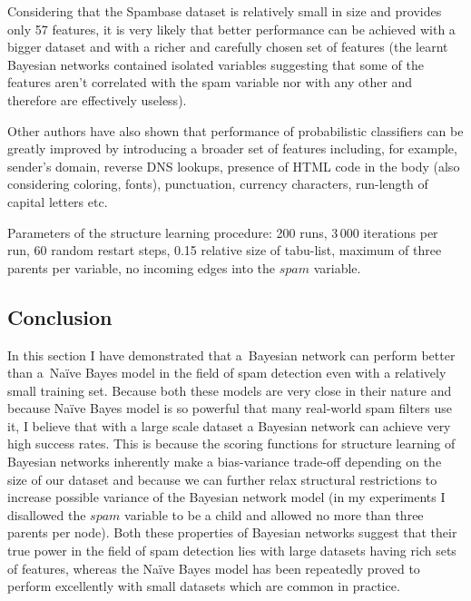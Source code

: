 \documentclass[english,cover]{fitthesis} %
\newcommand{\todo}[1]{{\color{red}#1}}
\begin{document}
Considering that the Spambase dataset is relatively small in size and provides only 57 features, it is very likely that better performance can be achieved with a bigger dataset and with a richer and carefully chosen set of features (the learnt Bayesian networks contained isolated variables suggesting that some of the features aren't correlated with the spam variable nor with any other and therefore are effectively useless).

Other authors have also shown that performance of probabilistic classifiers can be greatly improved by introducing a broader set of features including, for example, sender's domain, reverse DNS lookups, presence of HTML code in the body (also considering coloring, fonts), punctuation, currency characters, run-length of capital letters etc.~\cite{heckerman98_spam}

\medskip
Parameters of the structure learning procedure: 200 runs, 3\,000 iterations per run, 60 random restart steps, 0.15 relative size of tabu-list, maximum of three parents per variable, no incoming edges into the $spam$ variable.


\subsection{Conclusion}
In this section I have demonstrated that a~Bayesian network can perform better than a~Naïve Bayes model in the field of spam detection even with a relatively small training set. Because both these models are very close in their nature and because Naïve Bayes model is so powerful that many real-world spam filters use it, I believe that with a large scale dataset a Bayesian network can achieve very high success rates. This is because the scoring functions for structure learning of Bayesian networks inherently make a bias-variance trade-off depending on the size of our dataset and because we can further relax structural restrictions to increase possible variance of the Bayesian network model (in my experiments I disallowed the $spam$ variable to be a child and allowed no more than three parents per node). Both these properties of Bayesian networks suggest that their true power in the field of spam detection lies with large datasets having rich sets of features, whereas the Naïve Bayes model has been repeatedly proved to perform excellently with small datasets which are common in practice.

\end{document}
